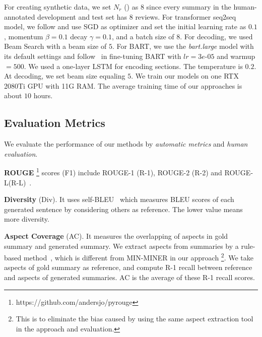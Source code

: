 For creating synthetic data, 
we set $N_r$ () as $8$ 
since every summary in the human-annotated development and test set has $8$ reviews.
For transformer seq2seq model, we follow \citet{Transformer17} and use SGD as optimizer and set the initial learning rate as $0.1$, momentum $\beta=0.1$ 
decay $\gamma=0.1$, and a batch size of 8. 
For decoding, we used Beam Search with a beam size of $5$.
For BART, we use the {\em bart.large} model with its 
default settings and follow~\citet{BART20} in fine-tuning BART with
$lr=3e$-$05$ and warmup $=500$. We used a one-layer LSTM for encoding sections. 
The temperature is $0.2$.
At decoding, we set beam size equaling $5$.
We train our models on one RTX 2080Ti GPU with 11G RAM. 
The average training time of our approaches is about $10$ hours.

\addtocounter{footnote}{-1}
\addtocounter{footnote}{1}

\subsection{Evaluation Metrics}
We evaluate the performance of our methods by {\em automatic metrics}
and {\em human evaluation}.


\textbf{ROUGE}
\footnote{https://github.com/andersjo/pyrouge} 
scores (F1) include
ROUGE-1 (R-1), ROUGE-2 (R-2) and
ROUGE-L(R-L)~\cite{rouge}.


\textbf{Diversity} (Div). It uses self-BLEU~\cite{SelfBleu18}
which measures BLEU scores of each generated sentence by considering others as reference. 
The lower value means more diversity.

\textbf{Aspect Coverage} (AC).
It measures the overlapping of aspects in gold summary and generated summary.
We extract aspects from summaries 
by a rule-based method~\cite{aspect14},
which is different from MIN-MINER in our approach
\footnote{This is to eliminate the bias caused by using the same aspect extraction tool in the approach and evaluation.}.
We take aspects of gold summary as reference,
and compute R-1 recall between reference  
and aspects of generated summaries.
AC is the average of these R-1 recall scores.

